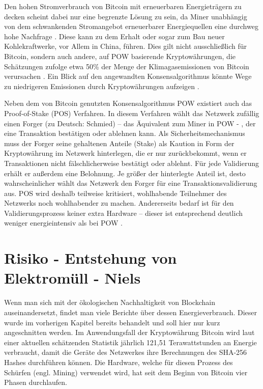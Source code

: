 Den hohen Stromverbrauch von Bitcoin mit erneuerbaren Energieträgern zu decken scheint dabei nur eine begrenzte Lösung zu sein, da Miner unabhängig von dem schwankenden Stromangebot erneuerbarer Energiequellen eine durchweg hohe Nachfrage \cite{de_vries_renewable_2019}. Diese kann zu dem Erhalt oder sogar zum Bau neuer Kohlekraftwerke, vor Allem in China, führen. Dies gilt nicht ausschließlich für Bitcoin, sondern auch andere, auf POW basierende Kryptowährungen, die Schätzungen zufolge etwa 50\% der Menge der Klimagasemissionen von Bitcoin verursachen \cite{gallersdorfer_energy_2020}. Ein Blick auf den angewandten Konsensalgorithmus könnte Wege zu niedrigeren Emissionen durch Kryptowährungen aufzeigen \cite{de_vries_renewable_2019}\cite{schinckus_good_2020}.

Neben dem von Bitcoin genutzten Konsensalgorithmus POW existiert auch das Proof-of-Stake (POS) Verfahren. In diesem Verfahren wählt das Netzwerk zufällig einen Forger (zu Deutsch: Schmied) – das Äquivalent zum Miner in POW - , der eine Transaktion bestätigen oder ablehnen kann. Als Sicherheitsmechanismus muss der Forger seine gehaltenen Anteile (Stake) als Kaution in Form der Kryptowährung im Netzwerk hinterlegen, die er nur zurückbekommt, wenn er Transaktionen nicht fälschlicherweise bestätigt oder ablehnt. Für jede Validierung erhält er außerdem eine Belohnung. Je größer der hinterlegte Anteil ist, desto wahrscheinlicher wählt das Netzwerk den Forger für eine Transaktionsvalidierung aus. POS wird deshalb teilweise kritisiert, wohlhabende Teilnehmer des Netzwerks noch wohlhabender zu machen. Andererseits bedarf ist für den Validierungsprozess keiner extra Hardware – dieser ist entsprechend deutlich weniger energieintensiv als bei POW \cite{adam_konsensmodelle_2020}\cite{schinckus_good_2020}. 

\clearpage
\section{Risiko - Entstehung von Elektromüll - Niels}

Wenn man sich mit der ökologischen Nachhaltigkeit von Blockchain auseinandersetzt, findet man viele Berichte über dessen Energieverbrauch. Dieser wurde im vorherigen Kapitel bereits behandelt und soll hier nur kurz angeschnitten werden. Im Anwendungsfall der Kryptowährung Bitcoin wird laut einer aktuellen schätzenden Statistik \cite{de_vries_bitcoin_nodate} jährlich 121,51 Terawattstunden an Energie verbraucht, damit die Geräte des Netzwerkes ihre Berechnungen des SHA-256 Hashes durchführen können. Die Hardware, welche für diesen Prozess des Schürfen (engl. Mining) verwendet wird, hat seit dem Beginn von Bitcoin vier Phasen \cite{taylor_evolution_2017} durchlaufen.

